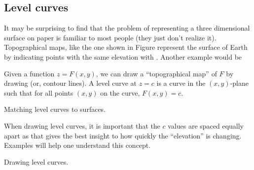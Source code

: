\documentclass{ximera}
\begin{document}
\subsection{Level curves}


It may be surprising to find that the problem of representing a three
dimensional surface on paper is familiar to most people (they just
don't realize it).  Topographical maps, like the one shown in Figure
represent the surface of Earth by indicating points with the same
elevation with . Another example would be 

Given a function $z=F(x,y)$, we can draw a ``topographical map'' of
$F$ by drawing  (or, contour lines). A level curve
at $z=c$ is a curve in the $(x,y)$-plane such that for all points
$(x,y)$ on the curve, $F(x,y) = c$.

\begin{image}
\end{image}

\begin{question}
  Matching level curves to surfaces.
\end{question}



When drawing level curves, it is important that the $c$ values are
spaced equally apart as that gives the best insight to how quickly the
``elevation'' is changing. Examples will help one understand this
concept.

\begin{example}
  Drawing level curves. 
\end{example}
\end{document}
